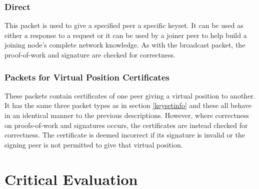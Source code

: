 \documentclass[ %
                    author={Luke Murray},
                supervisor={Dr. Simon Hollis},
                     title={Shadow Peer-to-Peer Networks},
                  subtitle={},
                    degree={MEng},
                      year={2013} ]{thesis}
\begin{document}
\subsection{Direct}

This packet is used to give a specified peer a specific keyset. It can be used as either a response to a request or it can be used by a joiner peer to help build a joining node's complete network knowledge. As with the broadcast packet, the proof-of-work and signature are checked for correctness.

\subsection{Packets for Virtual Position Certificates}

These packets contain certificates of one peer giving a virtual position to another. It has the same three packet types as in section \ref{keysetinfo} and these all behave in an identical manner to the previous descriptions. However, where correctness on proofs-of-work and signatures occurs, the certificates are instead checked for correctness. The certificate is deemed incorrect if its signature is invalid or the signing peer is not permitted to give that virtual position.



\chapter{Critical Evaluation}
\label{chap:evaluation}

\end{document}
